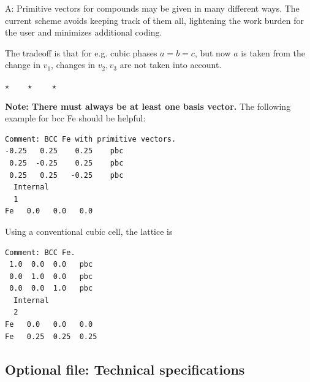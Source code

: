 \documentclass[a4paper,12pt,pdftex,onecolumn]{article}
\newcommand{\stars}{\begin{center}%
\vspace{1em plus 0.5em minus 0.5em}%
$\star \qquad \star \qquad \star$%
\vspace{1em plus 0.5em minus 0.5em}%
\end{center}}
\begin{document}
A: Primitive vectors for compounds may be given in many different ways.
The current scheme avoids keeping track of them all, lightening the work
burden for the user and minimizes additional coding.




The tradeoff is that for e.g. cubic phases $a=b=c$, but now $a$ is taken
from the change in $v_1$, changes in $v_2,v_3$ are not taken into
account.




\stars


\textbf{Note: There must always be at least one basis vector.}
The following example for bcc Fe should be helpful:

\begin{Verbatim}[fontsize=\relsize{-1},frame=single]
Comment: BCC Fe with primitive vectors.
-0.25   0.25    0.25    pbc
 0.25  -0.25    0.25    pbc
 0.25   0.25   -0.25    pbc
  Internal
  1
Fe   0.0   0.0   0.0
\end{Verbatim}

Using a conventional cubic cell, the lattice is

\begin{Verbatim}[fontsize=\relsize{-1},frame=single]
Comment: BCC Fe.
 1.0  0.0  0.0   pbc
 0.0  1.0  0.0   pbc
 0.0  0.0  1.0   pbc
  Internal
  2
Fe   0.0   0.0   0.0
Fe   0.25  0.25  0.25
\end{Verbatim}







\subsection{Optional file: Technical specifications}
\end{document}
